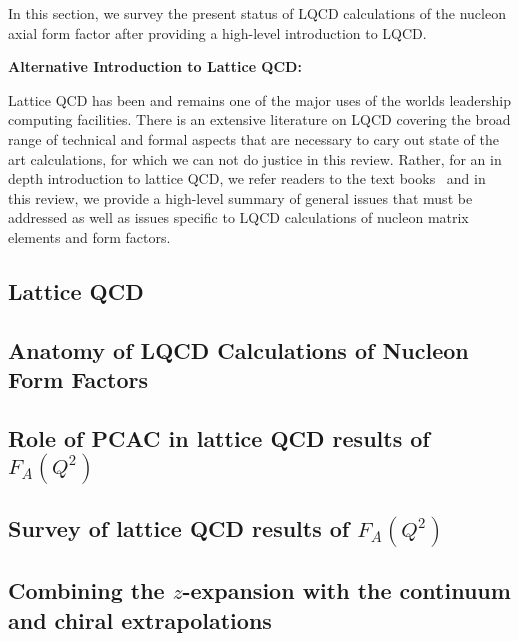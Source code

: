 In this section, we survey the present status of LQCD calculations of the nucleon axial form factor after providing a high-level introduction to LQCD.


\bigskip\noindent
\textbf{\large \color{red}Alternative Introduction to Lattice QCD:}

\noindent
Lattice QCD has been and remains one of the major uses of the worlds leadership computing facilities.
There is an extensive literature on LQCD covering the broad range of technical and formal aspects that are necessary to cary out state of the art calculations, for which we can not do justice in this review.
Rather, for an in depth introduction to lattice QCD, we refer readers to the text books~\cite{Smit:2002ug,DeGrand:2006zz,Gattringer:2010zz} and in this review, we provide a high-level summary of general issues that must be addressed as well as issues specific to LQCD calculations of nucleon matrix elements and form factors.


\subsection{Lattice QCD\label{sec:lqcd_intro}}


\subsection{Anatomy of LQCD Calculations of Nucleon Form Factors\label{sec:calc_anatomy}}


\subsection{Role of PCAC in lattice QCD results of $F_A(Q^2)$\label{sec:lqcd_pcac}}


\subsection{Survey of lattice QCD results of $F_A(Q^2)$\label{sec:lqcd_results}}


\subsection{Combining the $z$-expansion with the continuum and chiral extrapolations\label{sec:z_continuum}}


